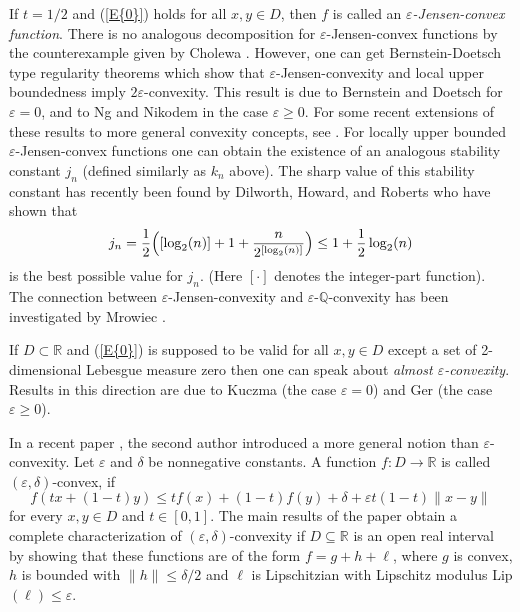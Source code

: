 \documentclass[12pt,leqno]{amsart}
\theoremstyle{definition}
\begin{document}
If $t=1/2$ and {{\rm(\ref{E{0}})}} holds for all $x,y\in D$, then $f$ is called an
{\it ${\varepsilon}$-Jensen-convex function}.  There is no analogous decomposition
for ${\varepsilon}$-Jensen-convex functions by the counterexample given by Cholewa
\cite{Cho84a}.  However, one can get Bernstein-Doetsch type regularity
theorems which show that ${\varepsilon}$-Jensen-convexity and local upper
boundedness imply $2{\varepsilon}$-convexity.  This result is due to Bernstein
and Doetsch \cite{BerDoe15} for ${\varepsilon}=0$, and to Ng and Nikodem \cite{NgNik93}
in the case ${\varepsilon}\ge0$.  For some recent extensions of these results
to more general convexity concepts, see \cite{Pal00b}. For locally
upper bounded ${\varepsilon}$-Jensen-convex functions one can obtain the existence
of an analogous stability constant $j_n$ (defined similarly as $k_n$
above). The sharp value of this stability constant has recently been
found by Dilworth, Howard, and Roberts \cite{DilHowRob99} who have shown that
$$
  j_n=\frac{1}{2}\Bigl([\log_2(n)]+1+\frac{n}{2^{[\log_2(n)]}}\Bigr)
     \le 1+\frac{1}{2}\log_2(n)
$$
is the best possible value for $j_n$. (Here $[\cdot]$ denotes the
integer-part function). The connection between ${\varepsilon}$-Jensen-convexity
and ${\varepsilon}$-${\mathbb{Q}}$-convexity has been investigated by Mrowiec \cite{Mro01}.

If $D\subset{\mathbb{R}}$ and {{\rm(\ref{E{0}})}} is supposed to be valid for all $x,y\in D$
except a set of 2-dimensional Lebesgue measure zero then one can speak
about {\it almost ${\varepsilon}$-convexity}.  Results in this direction are due
to Kuczma \cite{Kuc70a} (the case ${\varepsilon}=0$) and Ger \cite{Ger88c} (the
case ${\varepsilon}\ge0$).

In a recent paper \cite{Pal03a}, the second author introduced a more
general notion than ${\varepsilon}$-convexity. Let ${\varepsilon}$
and ${\delta}$ be nonnegative constants. A function $f:D \to{\mathbb{R}}$
is called $({\varepsilon},\delta)$-convex, if
$$
  f\left(t x+(1-t) y \right)
    \leq t f(x) + (1-t) f(y) + \delta + {\varepsilon} t (1-t) \|x-y\|
$$
for every $x,y\in D$ and $t \in[0,1]$. The main results of the paper
\cite{Pal03a} obtain a complete characterization of $({\varepsilon},\delta)$-convexity
if $D\subseteq{\mathbb{R}}$ is an open real interval
by showing that these functions are of the form $f=g+h+\ell$, where $g$ is convex,
$h$ is bounded with $\|h\|\leq {\delta}/2$ and $\ell$ is Lipschitzian with Lipschitz modulus
Lip$(\ell)\leq{\varepsilon}$.
\end{document}

